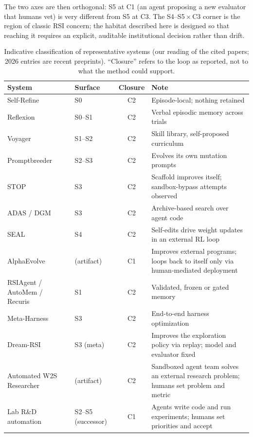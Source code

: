 \documentclass[11pt,a4paper]{article}
\begin{document}
The two axes are then orthogonal: S5 at C1 (an agent proposing a new evaluator that humans vet) is very different from S5 at C3. The S4--S5\,$\times$\,C3 corner is the region of classic RSI concern; the habitat described here is designed so that reaching it requires an explicit, auditable institutional decision rather than drift.

\begin{table}[t]
\centering\small
\caption{Indicative classification of representative systems (our reading of the cited papers; 2026 entries are recent preprints). ``Closure'' refers to the loop as reported, not to what the method could support.}
\label{tab:systems}
\begin{tabularx}{\textwidth}{>{\raggedright\arraybackslash}p{3.4cm} >{\raggedright\arraybackslash}p{1.7cm} c >{\raggedright\arraybackslash}X}
\toprule
\textbf{System} & \textbf{Surface} & \textbf{Closure} & \textbf{Note}\\
\midrule
Self-Refine~\cite{selfrefine} & S0 & C2 & Episode-local; nothing retained\\
Reflexion~\cite{reflexion} & S0--S1 & C2 & Verbal episodic memory across trials\\
Voyager~\cite{voyager} & S1--S2 & C2 & Skill library, self-proposed curriculum\\
Promptbreeder~\cite{promptbreeder} & S2--S3 & C2 & Evolves its own mutation prompts\\
STOP~\cite{stop} & S3 & C2 & Scaffold improves itself; sandbox-bypass attempts observed\\
ADAS / DGM~\cite{adas,dgm} & S3 & C2 & Archive-based search over agent code\\
SEAL~\cite{seal} & S4 & C2 & Self-edits drive weight updates in an external RL loop\\
AlphaEvolve~\cite{alphaevolve} & (artifact) & C1 & Improves external programs; loops back to itself only via human-mediated deployment\\
RSIAgent / AutoMem / Recuris~\cite{rsiagent,automem,recuris} & S1 & C2 & Validated, frozen or gated memory\\
Meta-Harness~\cite{metaharness} & S3 & C2 & End-to-end harness optimization\\
Dream-RSI~\cite{dreamrsi} & S3 (meta) & C2 & Improves the exploration policy via replay; model and evaluator fixed\\
Automated W2S Researcher~\cite{w2s} & (artifact) & C2 & Sandboxed agent team solves an external research problem; humans set problem and metric\\
Lab R\&D automation~\cite{anthropic-rsi,openai-accel} & S2--S5 (successor) & C1 & Agents write code and run experiments; humans set priorities and accept\\
\bottomrule
\end{tabularx}
\end{table}
\end{document}
